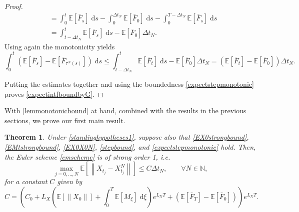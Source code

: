 \documentclass[reqno,12pt]{amsart}
\theoremstyle{plain} %
\newtheorem{theorem}{Theorem}[section]
\theoremstyle{definition} %
\begin{document}
\begin{proof}
\begin{align*}
        & = \int_0^t \mathbb{E}[\bar F_s] \;\mathrm{d}s - \int_0^{\Delta t_N} \mathbb{E}[\bar F_0]\;\mathrm{d}s - \int_{0}^{T-\Delta t_N} \mathbb{E}[\bar F_s]\;\mathrm{d}s \\
        & = \int_{t-\Delta t_N}^t \mathbb{E}[\bar F_s] \;\mathrm{d}s - \mathbb{E}[\bar F_0]\Delta t_N.
    \end{align*}
    Using again the monotonicity yields
    \[ 
      \int_0^t (\mathbb{E}[\bar F_s] - \mathbb{E}[\bar F_{\tau^N(s)}])\;\mathrm{d}s \leq \int_{t-\Delta t_N}^t \mathbb{E}[\bar F_t] \;\mathrm{d}s - \mathbb{E}[\bar F_0]\Delta t_N= (\mathbb{E}[\bar F_t] - \mathbb{E}[\bar F_0])\Delta t_N.
    \]

    Putting the estimates together and using the boundedness \eqref{expectstepmonotonic} proves \eqref{expectintfboundbyG}.
\end{proof}

With \cref{lemmonotonicbound} at hand, combined with the results in the previous sections, we prove our first main result.
\begin{theorem}
    \label{thmmonotonicbound}
    Under \cref{standinghypotheses1}, suppose also that
    \eqref{EX0strongbound}, \eqref{EMtstrongbound}, \eqref{EX0X0N}, \eqref{stepbound}, and \eqref{expectstepmonotonic} hold. Then, the Euler scheme \eqref{emscheme} is of strong order 1, i.e.
    \begin{equation}
      \label{monotonicboundstrongordernew}
        \max_{j=0, \ldots, N}\mathbb{E}\left[ \left\| X_{t_j} - X_{t_j}^N \right\| \right] \leq C \Delta t_N, \qquad \forall N \in \mathbb{N},
    \end{equation}
    for a constant $C$ given by
    \begin{equation}
        \label{constmonotonicboundstrongordernew}
        C = \left(C_0 + L_X \left(\mathbb{E}[\|X_0\|] + \int_0^{T} \mathbb{E}[M_\xi]\;\mathrm{d}\xi\right)e^{L_X T} + (\mathbb{E}[\bar F_T] - \mathbb{E}[\bar F_0])\right)e^{L_X T}.
    \end{equation}
\end{theorem}
\end{document}
